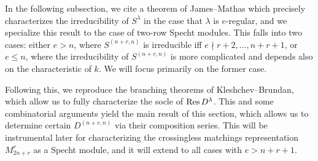 \documentclass{amsart}
\begin{document}
  In the following subsection, we cite a theorem of James--Mathas which precisely characterizes the irreducibility of $S^\lambda$ in the case that $\lambda$ is $e$-regular, and we specialize this result to the case of two-row Specht modules.
  This falls into two cases: either $e > n$, where $S^{(n+r,n)}$ is irreducible iff $e \nmid r+2,\dots,n+r+1$, or $e \leq n$, where the irreducibility of $S^{(n+r,n)}$ is more complicated and depends also on the characteristic of $k$.
  We will focus primarily on the former case.

  Following this, we reproduce the branching theorems of Kleshchev--Brundan, which allow us to fully characterize the socle of $\operatorname{Res} D^{\lambda}$.
  This and some combinatorial arguments yield the main result of this section, which allows us to determine certain $D^{(n+r,n)}$ via their composition series.
  This will be instrumental later for characterizing the crossingless matchings representation $M_{2n + r}^r$ as a Specht module, and it will extend to all cases with $e > n + r + 1$.
\end{document}
